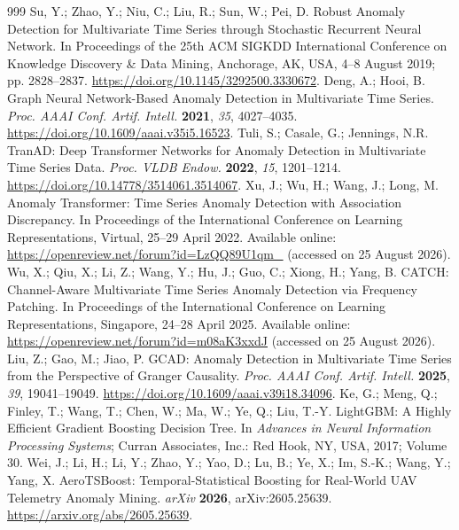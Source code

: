 \documentclass[drones,article,submit,moreauthors]{Definitions/mdpi}
\begin{document}
\begin{thebibliography}{999}
 Su, Y.; Zhao, Y.; Niu, C.; Liu, R.; Sun, W.; Pei, D. Robust Anomaly Detection for Multivariate Time Series through Stochastic Recurrent Neural Network. In Proceedings of the 25th ACM SIGKDD International Conference on Knowledge Discovery \& Data Mining, Anchorage, AK, USA, 4--8 August 2019; pp. 2828--2837. \href{https://doi.org/10.1145/3292500.3330672}{https://doi.org/10.1145/3292500.3330672}.
 Deng, A.; Hooi, B. Graph Neural Network-Based Anomaly Detection in Multivariate Time Series. \textit{Proc. AAAI Conf. Artif. Intell.} \textbf{2021}, \textit{35}, 4027--4035. \href{https://doi.org/10.1609/aaai.v35i5.16523}{https://doi.org/10.1609/aaai.v35i5.16523}.
 Tuli, S.; Casale, G.; Jennings, N.R. TranAD: Deep Transformer Networks for Anomaly Detection in Multivariate Time Series Data. \textit{Proc. VLDB Endow.} \textbf{2022}, \textit{15}, 1201--1214. \href{https://doi.org/10.14778/3514061.3514067}{https://doi.org/10.14778/3514061.3514067}.
 Xu, J.; Wu, H.; Wang, J.; Long, M. Anomaly Transformer: Time Series Anomaly Detection with Association Discrepancy. In Proceedings of the International Conference on Learning Representations, Virtual, 25--29 April 2022. Available online: \url{https://openreview.net/forum?id=LzQQ89U1qm_} (accessed on 25 August 2026).
 Wu, X.; Qiu, X.; Li, Z.; Wang, Y.; Hu, J.; Guo, C.; Xiong, H.; Yang, B. CATCH: Channel-Aware Multivariate Time Series Anomaly Detection via Frequency Patching. In Proceedings of the International Conference on Learning Representations, Singapore, 24--28 April 2025. Available online: \url{https://openreview.net/forum?id=m08aK3xxdJ} (accessed on 25 August 2026).
 Liu, Z.; Gao, M.; Jiao, P. GCAD: Anomaly Detection in Multivariate Time Series from the Perspective of Granger Causality. \textit{Proc. AAAI Conf. Artif. Intell.} \textbf{2025}, \textit{39}, 19041--19049. \href{https://doi.org/10.1609/aaai.v39i18.34096}{https://doi.org/10.1609/aaai.v39i18.34096}.
 Ke, G.; Meng, Q.; Finley, T.; Wang, T.; Chen, W.; Ma, W.; Ye, Q.; Liu, T.-Y. LightGBM: A Highly Efficient Gradient Boosting Decision Tree. In \textit{Advances in Neural Information Processing Systems}; Curran Associates, Inc.: Red Hook, NY, USA, 2017; Volume 30.
 Wei, J.; Li, H.; Li, Y.; Zhao, Y.; Yao, D.; Lu, B.; Ye, X.; Im, S.-K.; Wang, Y.; Yang, X. AeroTSBoost: Temporal-Statistical Boosting for Real-World UAV Telemetry Anomaly Mining. \textit{arXiv} \textbf{2026}, arXiv:2605.25639. \href{https://arxiv.org/abs/2605.25639}{https://arxiv.org/abs/2605.25639}.

\end{thebibliography}
\end{document}
